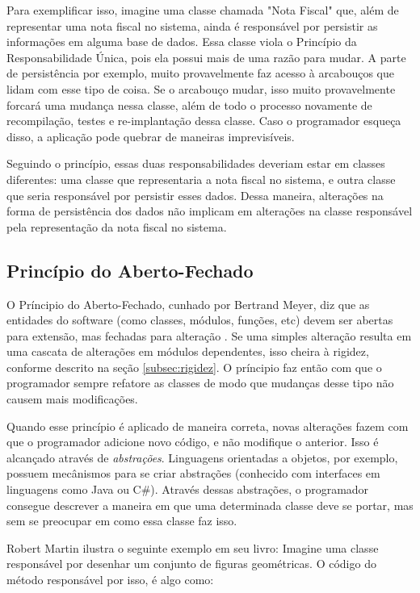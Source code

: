 Para exemplificar isso, imagine uma classe chamada "Nota Fiscal" que, além de representar uma nota fiscal no sistema, ainda
é responsável por persistir as informações em alguma base de dados. Essa classe viola o Princípio da Responsabilidade Única,
pois ela possui mais de uma razão para mudar. A parte de persistência por exemplo, muito provavelmente faz acesso à arcabouços
que lidam com esse tipo de coisa. Se o arcabouço mudar, isso muito provavelmente forcará uma mudança nessa classe, além de 
todo o processo novamente de recompilação, testes e re-implantação dessa classe. Caso o programador esqueça disso, a aplicação
pode quebrar de maneiras imprevisíveis.

Seguindo o princípio, essas duas responsabilidades deveriam estar em classes diferentes: uma classe que representaria a nota
fiscal no sistema, e outra classe que seria responsável por persistir esses dados. Dessa maneira, alterações na forma de
persistência dos dados não implicam em alterações na classe responsável pela representação da nota fiscal no sistema.

\subsection{Princípio do Aberto-Fechado}
\label{subsec:ocp}

O Príncipio do Aberto-Fechado, cunhado por Bertrand Meyer, diz que as entidades do software (como classes, módulos, funções, etc)
devem ser abertas para extensão, mas fechadas para alteração \cite{meyer-ocp}. Se uma simples alteração resulta em uma cascata
de alterações em módulos dependentes, isso cheira à rigidez, conforme descrito na seção \ref{subsec:rigidez}. O príncipio faz então
com que o programador sempre refatore as classes de modo que mudanças desse tipo não causem mais modificações.

Quando esse princípio é aplicado de maneira correta, novas alterações fazem com que o programador adicione novo código, e não
modifique o anterior. Isso é alcançado através de \textit{abstrações}. Linguagens orientadas a objetos, por exemplo, possuem
mecânismos para se criar abstrações (conhecido com interfaces em linguagens como Java ou C\#). Através dessas abstrações,
o programador consegue descrever a maneira em que uma determinada classe deve se portar, mas sem se preocupar em como
essa classe faz isso.

Robert Martin \cite{bob-martin} ilustra o seguinte exemplo em seu livro: Imagine uma classe responsável por desenhar 
um conjunto de figuras geométricas. O código do método responsável por isso, é algo como:


